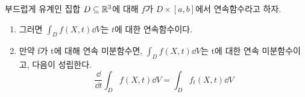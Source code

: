 \begin{theorem}
부드럽게 유계인 집합 $D\subseteq\mathbb{R}^3$에 대해 $f$가 $D\times[a,b]$에서 연속함수라고 하자.
\begin{enumerate}[label=(\alph*)]
    \item 그러면 $\int_Df(X,t)\dd V$는 $t$에 대한 연속함수이다.
    \item 만약 f가 t에 대해 연속 미분함수면, $\int_Df(X,t)\dd V$는 t에 대한 연속 미분함수이고, 다음이 성립한다.
    $$
    \frac{\dd}{\dd t}\int_Df(X,t)\dd V = \int_D f_t(X,t)\dd V
    $$
\end{enumerate}
\end{theorem}
